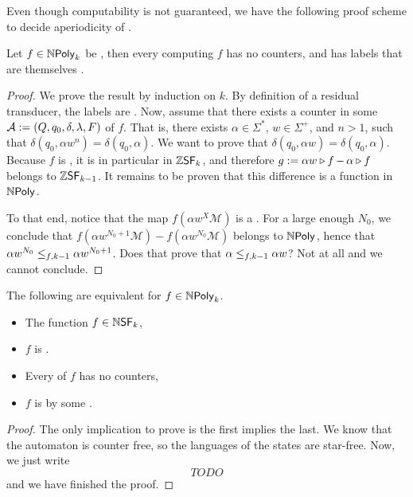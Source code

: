 Even though computability is not guaranteed, we have the following proof
scheme to decide aperiodicity of .
\begin{lemma}
    Let $f \in \NPoly[k]$ be ,
    then every  computing 
    $f$ has no counters, and has labels
    that are themselves 
    .
\end{lemma}
\begin{proof}

    We prove the result by induction on $k$. By definition
    of a residual transducer, the labels are .
    Now, assume that there exists a counter
    in some 
    $\aTransd \defined (Q, q_0, \delta, \lambda, F)$ of $f$. That is, there exists $\alpha \in \Sigma^*$,
    $w \in \Sigma^+$, and $n > 1$, such that
    $\delta(q_0,\alpha w^n) = \delta(q_0, \alpha)$.
    We want to prove that
    $\delta(q_0, \alpha w) = \delta(q_0, \alpha)$.
    Because $f$ is ,
    it is in particular in $\ZSF[k]$, and therefore
    $g \defined \app{f}{\alpha w} - \app{f}{\alpha}$
    belongs to $\ZSF[k-1]$.
    It remains to be proven that this difference is a function in
    $\NPoly$.

    To that end, notice that the map $f(\alpha w^X \mathcal{M})$ is a
     . For a large
    enough $N_0$, we conclude that $f(\alpha w^{N_0+1} \mathcal{M}) - f(\alpha
    w^{N_0} \mathcal{M})$ belongs to $\NPoly$, hence that $\alpha w^{N_0}
    \resleq{f}{k-1} \alpha w^{N_0 + 1}$. Does that prove that $\alpha
    \resleq{f}{k-1} \alpha w$? Not at all and we cannot conclude.
\end{proof}

\begin{theorem}
    The following are equivalent for $f \in \NPoly[k]$.
    \begin{itemize}
        \item The function $f \in \NSF[k]$,
        \item $f$ is .
        \item Every  of $f$ has no counters,
        \item $f$ is  by some
            .
    \end{itemize}
\end{theorem}
\begin{proof}
    The only implication to prove is the first implies the last.
    We know that the automaton is counter free, so the languages of the states
    are star-free. Now, we just write 
    \begin{equation*}
        TODO
    \end{equation*}
    and we have finished the proof.
\end{proof}

